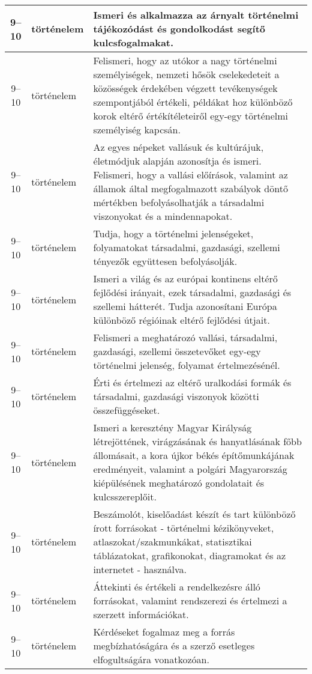 \begin{small}
\begin{longtable}{c | p{2cm} |  p{11cm} }
              9--10 & történelem & Ismeri és alkalmazza az árnyalt történelmi tájékozódást és gondolkodást segítő kulcsfogalmakat. \\ \hline
              9--10 & történelem & Felismeri, hogy az utókor a nagy történelmi személyiségek, nemzeti hősök cselekedeteit a közösségek érdekében végzett tevékenységek szempontjából értékeli, példákat hoz különböző korok eltérő értékítéleteiről egy-egy történelmi személyiség kapcsán. \\ \hline
              9--10 & történelem & Az egyes népeket vallásuk és kultúrájuk, életmódjuk alapján azonosítja és ismeri. Felismeri, hogy a vallási előírások, valamint az államok által megfogalmazott szabályok döntő mértékben befolyásolhatják a társadalmi viszonyokat és a mindennapokat. \\ \hline
              9--10 & történelem & Tudja, hogy a történelmi jelenségeket, folyamatokat társadalmi, gazdasági, szellemi tényezők együttesen befolyásolják. \\ \hline
              9--10 & történelem & Ismeri a világ és az európai kontinens eltérő fejlődési irányait, ezek társadalmi, gazdasági és szellemi hátterét. Tudja azonosítani Európa különböző régióinak eltérő fejlődési útjait. \\ \hline
              9--10 & történelem & Felismeri a meghatározó vallási, társadalmi, gazdasági, szellemi összetevőket egy-egy történelmi jelenség, folyamat értelmezésénél. \\ \hline
              9--10 & történelem & Érti és értelmezi az eltérő uralkodási formák és társadalmi, gazdasági viszonyok közötti összefüggéseket. \\ \hline
              9--10 & történelem & Ismeri a keresztény Magyar Királyság létrejöttének, virágzásának és hanyatlásának főbb állomásait, a kora újkor békés építőmunkájának eredményeit, valamint a polgári Magyarország kiépülésének meghatározó gondolatait és kulcsszereplőit. \\ \hline
              9--10 & történelem & Beszámolót, kiselőadást készít és tart különböző írott forrásokat - történelmi kézikönyveket, atlaszokat/szakmunkákat, statisztikai táblázatokat, grafikonokat, diagramokat és az internetet - használva. \\ \hline
              9--10 & történelem & Áttekinti és értékeli a rendelkezésre álló forrásokat, valamint rendszerezi és értelmezi a szerzett információkat. \\ \hline
              9--10 & történelem & Kérdéseket fogalmaz meg a forrás megbízhatóságára és a szerző esetleges elfogultságára vonatkozóan. \\ \hline

\end{longtable}
\end{small}

